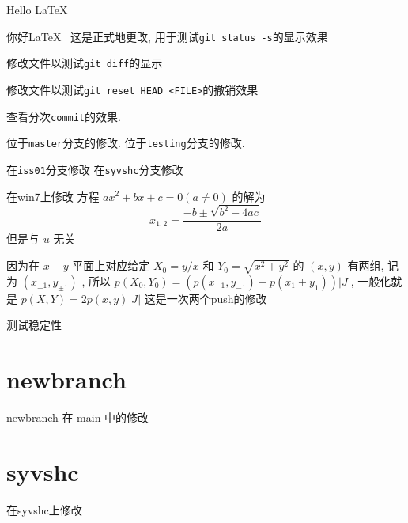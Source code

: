 \documentclass{ctexart}
\begin{document}
	Hello \LaTeX~

	你好\LaTeX~ %
	这是正式地更改, 用于测试\verb|git status -s|的显示效果

	修改文件以测试\verb|git diff|的显示

	修改文件以测试\verb|git reset HEAD <FILE>|的撤销效果

	查看分次\verb|commit|的效果. 

	位于\verb|master|分支的修改. 
	位于\verb|testing|分支的修改. 
	
	在\verb|iss01|分支修改
	在\verb|syvshc|分支修改

	在win7上修改
	方程 $ ax^{2}+bx+c=0(a\ne 0) $ 的解为
	\[
		x_{1, 2}=\frac{-b\pm\sqrt{b^{2}-4ac}}{2a}
	\]
	但是与 \uline{$ u $ 无关}

	因为在 $ x-y $ 平面上对应给定 $ X_{0}=y/x $ 和 $ Y_{0}=\sqrt{x^{2}+y^{2}} $ 的 $ (x, y) $ 有两组, 记为 $ (x_{\pm1}, y_{\pm1}) $ , 所以 $ p(X_{0}, Y_{0})=(p(x_{-1}, y_{-1})+p(x_{1}+y_{1}))|J| $, 一般化就是 $ p(X, Y)=2p(x, y)|J| $
	这是一次两个push的修改

	测试稳定性
	\section{newbranch}
	newbranch 在 main 中的修改

	\section{syvshc}
	在syvshc上修改
  
\end{document}
